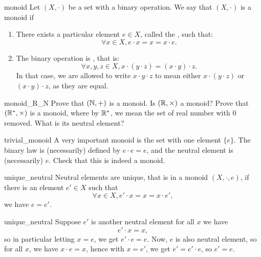 \begin{cdef}{}{monoid}
    Let \( (X, \cdot) \) be a set with a binary operation. We say that \( (X, \cdot) \) is a monoid if
    \begin{enumerate}
        \item There exists a particular element \( e \in X \), called the , such that:
        \begin{equation*}
            \forall x \in X, e \cdot x = x = x \cdot e.
        \end{equation*}
        \item The binary operation is , that is:
        \begin{equation*}
            \forall x, y, z \in X, x\cdot(y \cdot z) = (x \cdot y) \cdot z.
        \end{equation*}
            In that case, we are allowed to write \( x \cdot y \cdot z  \) to mean either \( x\cdot(y \cdot z) \) or \( (x \cdot y) \cdot z \), as they are equal.
    \end{enumerate}
\end{cdef}

\begin{cexp}{}{monoid_R_N}
    Prove that \( (\mathbb{N}, +) \) is a monoid. Is \( (\mathbb{R}, \times) \) a monoid? Prove that \( (\mathbb{R}^*, \times) \) is a monoid, where by \( \mathbb{R}^* \), we mean the set of real number with \( 0 \) removed. What is its neutral element?
\end{cexp}

\begin{cexp}{}{trivial_monoid}
    A very important monoid is the set with one element \( \{ e \} \). The binary law is (necessarily) defined by \( e \cdot e = e \), and the neutral element is (necessarily) \( e \). Check that this is indeed a monoid.
\end{cexp}

\begin{clem}{}{unique_neutral}
    Neutral elements are unique, that is in a monoid \( (X, \cdot, e) \), if there is an element \( e' \in X \) such that 
    \begin{equation*}
        \forall x \in X, e' \cdot x = x = x \cdot e',
    \end{equation*}
    we have \( e = e' \).
\end{clem}
\begin{lemproof}{unique_neutral}
    Suppose \( e' \) is another neutral element for all \( x \) we have 
    \begin{equation*}
        e' \cdot x = x, 
    \end{equation*}
    so in particular letting \( x = e \), we get \( e' \cdot e = e \). Now, \( e \) is also neutral element, so for all \( x \), we have \( x \cdot e = x \), hence with \( x = e' \), we get \( e' = e' \cdot e \), so \( e' = e \).
\end{lemproof}

